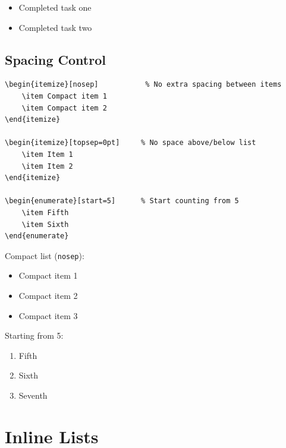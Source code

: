 \begin{itemize}[label=$\checkmark$]
    \item Completed task one
    \item Completed task two
\end{itemize}

\subsection{Spacing Control}

\begin{lstlisting}[language={[LaTeX]TeX}, caption=List spacing]
\begin{itemize}[nosep]           % No extra spacing between items
    \item Compact item 1
    \item Compact item 2
\end{itemize}

\begin{itemize}[topsep=0pt]     % No space above/below list
    \item Item 1
    \item Item 2
\end{itemize}

\begin{enumerate}[start=5]      % Start counting from 5
    \item Fifth
    \item Sixth
\end{enumerate}
\end{lstlisting}

Compact list (\texttt{nosep}):
\begin{itemize}[nosep]
    \item Compact item 1
    \item Compact item 2
    \item Compact item 3
\end{itemize}

Starting from 5:
\begin{enumerate}[start=5]
    \item Fifth
    \item Sixth
    \item Seventh
\end{enumerate}

\section{Inline Lists}

